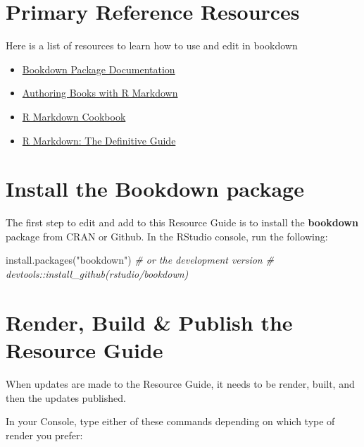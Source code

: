 \documentclass[
]{book}
\newenvironment{Shaded}{\begin{snugshade}}{\end{snugshade}}
\newcommand{\CommentTok}[1]{\textcolor[rgb]{0.56,0.35,0.01}{\textit{#1}}}
\newcommand{\FunctionTok}[1]{\textcolor[rgb]{0.00,0.00,0.00}{#1}}
\newcommand{\NormalTok}[1]{#1}
\newcommand{\StringTok}[1]{\textcolor[rgb]{0.31,0.60,0.02}{#1}}
\providecommand{\tightlist}{%
  \setlength{\itemsep}{0pt}\setlength{\parskip}{0pt}}
\begin{document}
\hypertarget{primary-reference-resources}{%
\section{Primary Reference Resources}\label{primary-reference-resources}}

Here is a list of resources to learn how to use and edit in bookdown

\begin{itemize}
\tightlist
\item
  \href{https://bookdown.org/}{Bookdown Package Documentation}
\item
  \href{https://bookdown.org/yihui/bookdown/}{Authoring Books with R Markdown}
\item
  \href{https://bookdown.org/yihui/rmarkdown-cookbook/}{R Markdown Cookbook}
\item
  \href{https://bookdown.org/yihui/rmarkdown/}{R Markdown: The Definitive Guide}
\end{itemize}

\hypertarget{install-the-bookdown-package}{%
\section{Install the Bookdown package}\label{install-the-bookdown-package}}

The first step to edit and add to this Resource Guide is to install the \textbf{bookdown} package from CRAN or Github. In the RStudio console, run the following:

\begin{Shaded}
\begin{Highlighting}[]
\FunctionTok{install.packages}\NormalTok{(}\StringTok{"bookdown"}\NormalTok{)}
\CommentTok{\# or the development version}
\CommentTok{\# devtools::install\_github(\textquotesingle{}rstudio/bookdown\textquotesingle{})}
\end{Highlighting}
\end{Shaded}

\hypertarget{render-build-publish-the-resource-guide}{%
\section{Render, Build \& Publish the Resource Guide}\label{render-build-publish-the-resource-guide}}

When updates are made to the Resource Guide, it needs to be render, built, and then the updates published.

In your Console, type either of these commands depending on which type of render you prefer:
\end{document}
